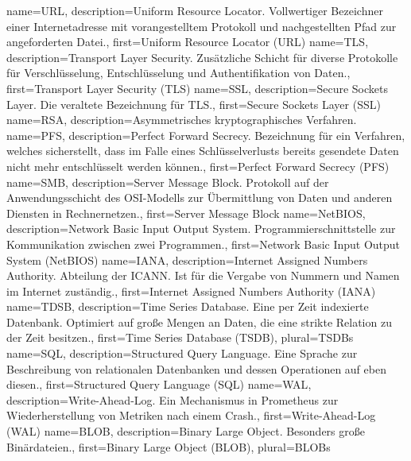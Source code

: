 {%
    name={URL},
    description={Uniform Resource Locator. Vollwertiger Bezeichner einer
    Internetadresse mit vorangestelltem Protokoll und nachgestellten
    Pfad zur angeforderten Datei.},
    first={Uniform Resource Locator (URL)}
}
{%
    name={TLS},
    description={Transport Layer Security. Zusätzliche Schicht für
    diverse Protokolle für Verschlüsselung, Entschlüsselung und
    Authentifikation von Daten.},
    first={Transport Layer Security (TLS)}
}
{%
    name={SSL},
    description={Secure Sockets Layer. Die veraltete Bezeichnung für
    TLS.},
    first={Secure Sockets Layer (SSL)}
}
{%
    name={RSA},
    description={Asymmetrisches kryptographisches Verfahren.}
}
{%
    name={PFS},
    description={Perfect Forward Secrecy. Bezeichnung für ein Verfahren,
    welches sicherstellt, dass im Falle eines Schlüsselverlusts bereits
    gesendete Daten nicht mehr entschlüsselt werden können.},
    first={Perfect Forward Secrecy (PFS)}
}
{%
    name={SMB},
    description={Server Message Block. Protokoll auf der
    Anwendungsschicht des OSI-Modells zur Übermittlung von Daten und
    anderen Diensten in Rechnernetzen.},
    first={Server Message Block}
}
{%
    name={NetBIOS},
    description={Network Basic Input Output System.
    Programmierschnittstelle zur Kommunikation zwischen zwei Programmen.},
    first={Network Basic Input Output System (NetBIOS)}
}
{%
    name={IANA},
    description={Internet Assigned Numbers Authority. Abteilung der
    ICANN. Ist für die Vergabe von Nummern und Namen im Internet
    zuständig.},
    first={Internet Assigned Numbers Authority (IANA)}
}
{%
    name={TDSB},
    description={Time Series Database. Eine per Zeit indexierte
    Datenbank. Optimiert auf große Mengen an Daten, die eine strikte
    Relation zu der Zeit besitzen.},
    first={Time Series Database (TSDB)},
    plural={TSDBs}
}
{%
    name={SQL},
    description={Structured Query Language. Eine Sprache zur
    Beschreibung von relationalen Datenbanken und dessen Operationen auf
    eben diesen.},
    first={Structured Query Language (SQL)}
}
{%
    name={WAL},
    description={Write-Ahead-Log. Ein Mechanismus in Prometheus zur
    Wiederherstellung von Metriken nach einem Crash.},
    first={Write-Ahead-Log (WAL)}
}
{%
    name={BLOB},
    description={Binary Large Object. Besonders große Binärdateien.},
    first={Binary Large Object (BLOB)},
    plural={BLOBs}
}
